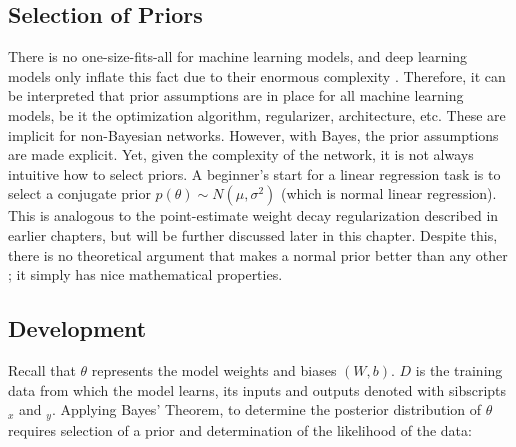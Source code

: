 \subsection{Selection of Priors}

There is no one-size-fits-all for machine learning models, and deep learning models only inflate this fact due to their enormous complexity \cite{Goodfellow-et-al-2016}.  Therefore, it can be interpreted \cite{Jospin} that prior assumptions are in place for all machine learning models, be it the optimization algorithm, regularizer, architecture, etc. These are implicit for non-Bayesian networks.  However, with Bayes, the prior assumptions are made explicit.  Yet, given the complexity of the network, it is not always intuitive how to select priors.  A beginner's start for a linear regression task is to select a conjugate prior $p(\theta) \sim N(\mu,\sigma^2)$ (which is normal linear regression).  This is analogous to the point-estimate weight decay regularization described in earlier chapters, but will be further discussed later in this chapter.  Despite this, there is no theoretical argument that makes a normal prior better than any other \cite{silvestro2020prior}; it simply has nice mathematical properties.


\subsection{Development}

Recall that $\theta$ represents the model weights and biases $(W,b)$.  $D$ is the training data from which the model learns, its inputs and outputs denoted with sibscripts $_x$ and $_y$.  Applying Bayes' Theorem, to determine the posterior distribution of $\theta$ requires selection of a prior and determination of the likelihood of the data:


